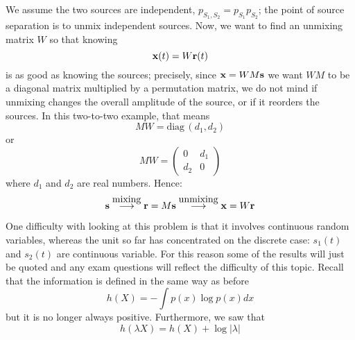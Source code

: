 \documentclass[12pt]{article}
\begin{document}
We assume the two sources are independent,
$p_{S_1,S_2}=p_{S_1}p_{S_2}$; the point of source separation is to
unmix independent sources. Now, we want to find an unmixing matrix $W$ so that knowing
\begin{equation} {\bf x}(t)=W{\bf r}(t) \end{equation} is as good as
knowing the sources; precisely, since ${\bf x}=WM{\bf s}$ we want $WM$
to be a diagonal matrix multiplied by a permutation matrix, we do not
mind if unmixing changes the overall amplitude of the source, or if it
reorders the sources. In this two-to-two example, that means
\begin{equation} MW=\mbox{diag}\,(d_1,d_2) \end{equation} or
\begin{equation}
MW=\left(\begin{array}{cc}0&d_1\\d_2&0\end{array}\right)
\end{equation} where $d_1$ and $d_2$ are real numbers. Hence:
\begin{equation} {\bf s}\stackrel{\mbox{mixing}}{\longrightarrow}{\bf
r}=M{\bf s}\stackrel{\mbox{unmixing}}{\longrightarrow}{\bf x}=W{\bf r}
\end{equation}

One difficulty with looking at this problem is that it involves
continuous random variables, whereas the unit so far has concentrated
on the discrete case: $s_1(t)$ and $s_2(t)$ are continuous
variable. For this reason some of the results will just be quoted and
any exam questions will reflect the difficulty of this topic. Recall that the
information is defined in the same way as before
\begin{equation} 
h(X)=-\int  p(x)\log{p(x)} dx 
\end{equation} 
but it is no longer always positive. Furthermore, we saw that
\begin{equation} 
h(\lambda X)=h(X)+\log{|\lambda|} 
\end{equation} 
\end{document}
